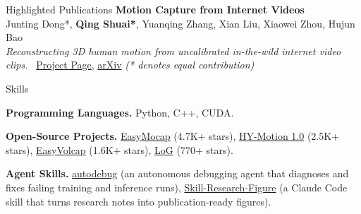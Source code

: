 \begin{rSection}{Highlighted Publications}
    {\bf Motion Capture from Internet Videos}\hfill{ } \\
    Junting Dong*, \textbf{Qing Shuai*}, Yuanqing Zhang, Xian Liu, Xiaowei Zhou, Hujun Bao\\
    \emph{Reconstructing 3D human motion from uncalibrated in-the-wild internet video clips.} \, \href{https://zju3dv.github.io/iMoCap/}{Project Page}, \href{https://arxiv.org/abs/2008.07931}{arXiv} {\em (* denotes equal contribution)}

\end{rSection}


\begin{rSection}{Skills}

    {\bf Programming Languages.} Python, C++, CUDA.

    {\bf Open-Source Projects.} \href{https://github.com/zju3dv/EasyMocap}{EasyMocap} (4.7K+ stars), \href{https://github.com/Tencent-Hunyuan/HY-Motion-1.0}{HY-Motion 1.0} (2.5K+ stars), \href{https://github.com/zju3dv/EasyVolcap}{EasyVolcap} (1.6K+ stars), \href{https://github.com/zju3dv/LoG}{LoG} (770+ stars).

    {\bf Agent Skills.} \href{https://github.com/chingswy/autodebug}{autodebug} (an autonomous debugging agent that diagnoses and fixes failing training and inference runs), \href{https://github.com/chingswy/Skill-Research-Figure}{Skill-Research-Figure} (a Claude Code skill that turns research notes into publication-ready figures).

\end{rSection}

